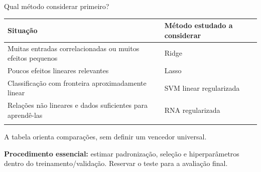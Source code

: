 \documentclass[
  10pt,
  ignorenonframetext,
  aspectratio=169,
  brazilian,
]{beamer}
\newcounter{none} %
\begin{document}
\begin{frame}{Qual método considerar primeiro?}
\protect{}\label{qual-muxe9todo-considerar-primeiro}
{\def\LTcaptype{none} %
\begin{longtable}[]{@{}
  >{\raggedright\arraybackslash}p{}
  >{\raggedright\arraybackslash}p{}@{}}
\toprule\noalign{}
\begin{minipage}[b]{\linewidth}\raggedright
Situação
\end{minipage} & \begin{minipage}[b]{\linewidth}\raggedright
Método estudado a considerar
\end{minipage} \\
\midrule\noalign{}
\endhead
Muitas entradas correlacionadas ou muitos efeitos pequenos & Ridge \\
Poucos efeitos lineares relevantes & Lasso \\
Classificação com fronteira aproximadamente linear & SVM linear
regularizada \\
Relações não lineares e dados suficientes para aprendê-las & RNA
regularizada \\
\bottomrule\noalign{}
\end{longtable}
}

A tabela orienta comparações, sem definir um vencedor universal.

\textbf{Procedimento essencial:} estimar padronização, seleção e
hiperparâmetros dentro do treinamento/validação. Reservar o teste para a
avaliação final.
\end{frame}
\end{document}
